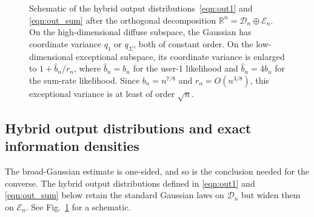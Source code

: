 \documentclass[11pt,onecolumn]{IEEEtran}
\newcommand{\calD}{\mathcal{D}}
\newcommand{\calE}{\mathcal{E}}
\begin{document}
\begin{figure}[t]
\begin{tikzpicture}
\end{tikzpicture}
\caption{Schematic of the hybrid  output distributions~\eqref{eqn:out1} and \eqref{eqn:out_sum} after the orthogonal
decomposition $\mathbb R^n=\mathcal D_n\oplus\mathcal E_n$. On the
high-dimensional diffuse subspace, the   Gaussian has coordinate
variance $q_1$ or $q_\Sigma$, both of constant order. On the low-dimensional
exceptional subspace, its coordinate variance is enlarged to
$1+\hat b_n/r_n$, where $\hat b_n=b_n$ for the user-1 likelihood and
$\hat b_n=4b_n$ for the sum-rate likelihood. Since
$b_n=n^{7/8}$ and $r_n=O(n^{3/8})$, this exceptional variance is at least of
order $\sqrt n$.  }
\label{fig:hybrid-output-laws}
\end{figure}
\subsection{Hybrid  output distributions and exact information densities} 
\label{sec:info_dens}
The broad-Gaussian estimate is one-sided, and so is the conclusion needed for the converse. The hybrid   output distributions  defined in \eqref{eqn:out1} and \eqref{eqn:out_sum} below retain the standard Gaussian laws on $\calD_n$ but widen them on $\calE_n$. See Fig.~\ref{fig:hybrid-output-laws} for a schematic. 
\end{document}
